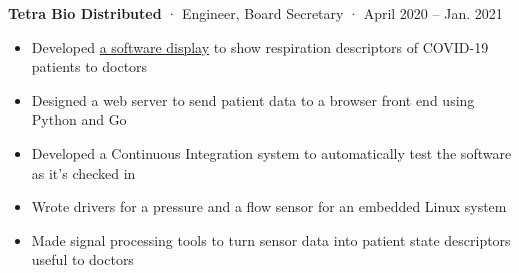 \documentclass[12pt, oneside]{article}
\newcommand{\jobtitle}[3] {
	{\bf #1} · {#2} · {#3} \vspace{-7pt} \\
}
\begin{document}
\begin{flushleft}
\jobtitle{Tetra Bio Distributed}{Engineer, Board Secretary}{April 2020 – Jan. 2021}
\begin{itemize}
	\item Developed \href{https://github.com/tetrabiodistributed/project-tetra-display}{a software display} to show respiration descriptors of COVID-19 patients to doctors \\
	\item Designed a web server to send patient data to a browser front end using Python and Go \\
	\item Developed a Continuous Integration system to automatically test the software as it's checked in \\
	\item Wrote drivers for a pressure and a flow sensor for an embedded Linux system \\
	\item Made signal processing tools to turn sensor data into patient state descriptors useful to doctors \\
\end{itemize}


\end{flushleft}
\end{document}
